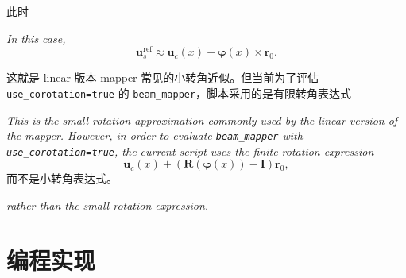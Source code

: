 \documentclass[UTF8,a4paper,11pt]{ctexart}
\begin{document}
此时
\par\noindent\emph{In this case,}
\begin{equation}
  \bm{u}_s^{\mathrm{ref}}
  \approx
  \bm{u}_c(x)
  +
  \bm{\varphi}(x) \times \bm{r}_0.
\end{equation}

这就是 linear 版本 mapper 常见的小转角近似。但当前为了评估 \texttt{use\_corotation=true} 的 \texttt{beam\_mapper}，脚本采用的是有限转角表达式
\par\noindent\emph{This is the small-rotation approximation commonly used by the linear version of the mapper.
However, in order to evaluate \texttt{beam\_mapper} with \texttt{use\_corotation=true}, the current script uses the finite-rotation expression}
\begin{equation}
  \bm{u}_c(x)
  +
  \left(\bm{R}(\bm{\varphi}(x))-\bm{I}\right)\bm{r}_0,
\end{equation}
而不是小转角表达式。
\par\noindent\emph{rather than the small-rotation expression.}

\section{编程实现}
\end{document}
